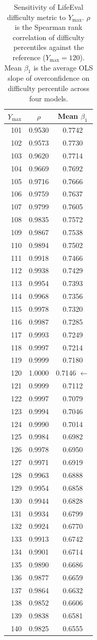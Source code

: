 \begin{table}[t]
\centering
\caption{Sensitivity of LifeEval difficulty metric to $Y_{\max}$. $\rho$ is the Spearman rank correlation of difficulty percentiles against the reference ($Y_{\max}=120$). Mean $\beta_1$ is the average OLS slope of overconfidence on difficulty percentile across four models.}
\label{tab:ymax_sensitivity}
\begin{tabular}{rcc}
\toprule
$Y_{\max}$ & $\rho$ & Mean $\beta_1$ \\
\midrule
101 & 0.9530 & 0.7742 \\
102 & 0.9573 & 0.7730 \\
103 & 0.9620 & 0.7714 \\
104 & 0.9669 & 0.7692 \\
105 & 0.9716 & 0.7666 \\
106 & 0.9759 & 0.7637 \\
107 & 0.9799 & 0.7605 \\
108 & 0.9835 & 0.7572 \\
109 & 0.9867 & 0.7538 \\
110 & 0.9894 & 0.7502 \\
111 & 0.9918 & 0.7466 \\
112 & 0.9938 & 0.7429 \\
113 & 0.9954 & 0.7393 \\
114 & 0.9968 & 0.7356 \\
115 & 0.9978 & 0.7320 \\
116 & 0.9987 & 0.7285 \\
117 & 0.9993 & 0.7249 \\
118 & 0.9997 & 0.7214 \\
119 & 0.9999 & 0.7180 \\
120 & 1.0000 & 0.7146 $\leftarrow$ \\
121 & 0.9999 & 0.7112 \\
122 & 0.9997 & 0.7079 \\
123 & 0.9994 & 0.7046 \\
124 & 0.9990 & 0.7014 \\
125 & 0.9984 & 0.6982 \\
126 & 0.9978 & 0.6950 \\
127 & 0.9971 & 0.6919 \\
128 & 0.9963 & 0.6888 \\
129 & 0.9954 & 0.6858 \\
130 & 0.9944 & 0.6828 \\
131 & 0.9934 & 0.6799 \\
132 & 0.9924 & 0.6770 \\
133 & 0.9913 & 0.6742 \\
134 & 0.9901 & 0.6714 \\
135 & 0.9890 & 0.6686 \\
136 & 0.9877 & 0.6659 \\
137 & 0.9864 & 0.6632 \\
138 & 0.9852 & 0.6606 \\
139 & 0.9838 & 0.6581 \\
140 & 0.9825 & 0.6555 \\
\bottomrule
\end{tabular}
\end{table}